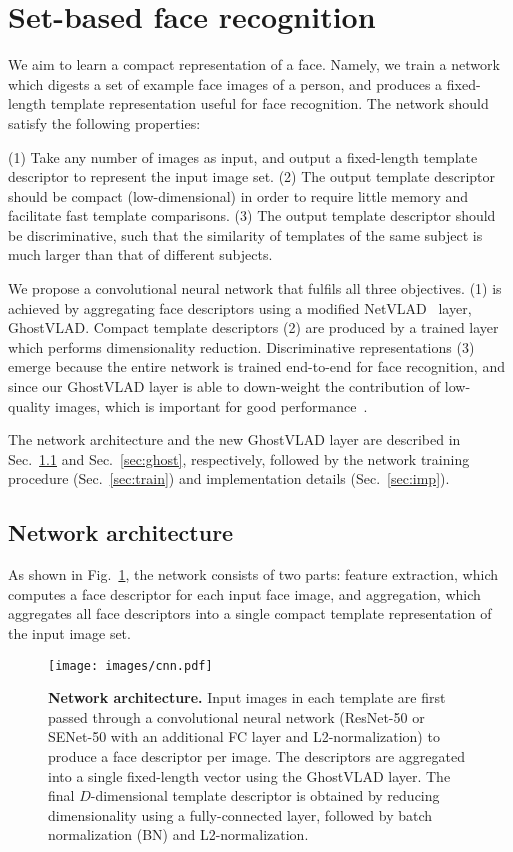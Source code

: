 \documentclass[runningheads]{llncs}
\begin{document}
\section{Set-based face recognition}
\label{sec:cnn}
We aim to learn a compact representation of a face.
Namely, we train a network which digests a set of example face images of
a person, and produces a fixed-length template representation
useful for face recognition.
The network should satisfy the following properties:

(1) Take any number of images as input, and output a 
fixed-length template descriptor to represent the 
input image set.
(2) The output template descriptor should be compact
(\ie low-dimensional) in order to require little memory
and facilitate fast template comparisons.
(3) The output template descriptor should be 
discriminative, such that the similarity of
templates of the same subject is much larger than that
of different subjects.

We propose a convolutional neural 
network that fulfils all three objectives.
(1) is achieved by aggregating face descriptors
using a modified NetVLAD~\cite{Arandjelovic16} layer, GhostVLAD.
Compact template descriptors (2) are produced by a
trained layer which performs dimensionality reduction.
Discriminative representations (3) emerge because
the entire network is trained end-to-end for face recognition,
and since our GhostVLAD layer is able to
down-weight the contribution of low-quality images,
which is important for good
performance~\cite{Goswami14,Yang17,Hassner16}.

The network architecture and the new GhostVLAD layer
are described
in Sec.~\ref{sec:arch} and Sec.~\ref{sec:ghost}, respectively,
followed by 
the network training procedure (Sec.~\ref{sec:train})
and implementation 
details (Sec.~\ref{sec:imp}).


\subsection{Network architecture}
\label{sec:arch}
As shown in Fig.~\ref{fig:cnn},
the network consists of two parts:
feature extraction, which computes a 
face descriptor for each input face image, and 
aggregation, which aggregates all face descriptors
into a single compact template representation of
the input image set.

\begin{figure}[t]
   \begin{center}
         \texttt{[image: images/cnn.pdf]}
   \end{center}
   \caption{\textbf{Network architecture.}
Input images in each template are first 
passed through a convolutional 
neural network (\eg ResNet-50 or SENet-50 with an additional
FC layer and L2-normalization) to produce 
a face descriptor per image.
The descriptors are aggregated into a single fixed-length
vector using the GhostVLAD layer.
The final $D$-dimensional template descriptor
is obtained by reducing dimensionality using a fully-connected layer,
followed by batch normalization (BN) and
L2-normalization.
   }
    \label{fig:cnn}
\end{figure}
\end{document}
